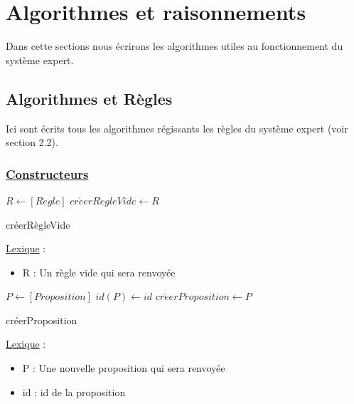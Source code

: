 \documentclass{article}
\begin{document}
\section{Algorithmes et raisonnements}
Dans cette sections nous écrirons les algorithmes utiles au fonctionnement du système expert.

\subsection{Algorithmes et Règles}
Ici sont écrits tous les algorithmes régissants les règles du système expert (voir section 2.2).
\subsubsection{\underline{Constructeurs}}
\begin{algorithm}
    \SetAlgoLined
    \begin{algorithmic}
        \STATE $R \gets [R\grave{e}gle]$
        \STATE $cr\acute{e}erR\grave{e}gleVide \gets R$ 
        \caption{créerRègleVide}
    \end{algorithmic}

\end{algorithm}

\underline{Lexique} :
\begin{itemize}
    \item R : Un règle vide qui sera renvoyée\\
\end{itemize}

\begin{algorithm}
    \SetAlgoLined
    \begin{algorithmic}
        \STATE $P \gets [Proposition]$
        \STATE $id(P) \gets id $
        \STATE $cr\acute{e}erProposition \gets P$ 
        \caption{créerProposition}
    \end{algorithmic}

\end{algorithm}

\underline{Lexique} :
\begin{itemize}
    \item P : Une nouvelle proposition qui sera renvoyée
    \item id : id de la proposition
\end{itemize}
\clearpage
\end{document}
